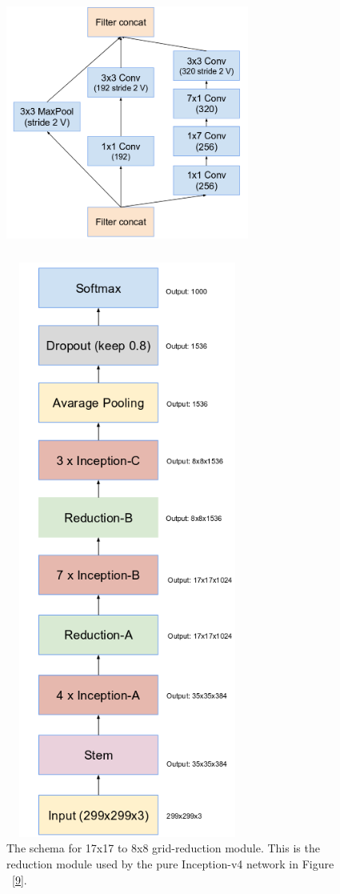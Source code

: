 \documentclass[a4paper,12pt, twoside]{NITKReport}
\begin{document}
\begin{figure}
\centering
\begin{minipage}[b]{0.4\textwidth}
    \includegraphics[height=9cm,width=8cm]{figure8.png}
    \caption{The schema for 17x17 to 8x8 grid-reduction module. This is the reduction module used by the pure Inception-v4 network in Figure ~\ref{9}.~\cite{szegedy2017inception}}
    \label{8}
  \end{minipage}
  \hfill
  \begin{minipage}[b]{0.4\textwidth}
 \includegraphics[height=19cm,width=8cm]{figure9.png}

\end{minipage}
\end{figure}
\end{document}
